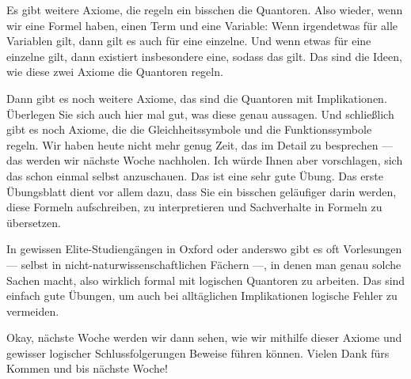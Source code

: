 \begin{spoken-clean}[01:24:37 - 01:26:27]
Es gibt weitere Axiome, die regeln ein bisschen die Quantoren. Also wieder, wenn wir eine Formel haben, einen Term und eine Variable: Wenn irgendetwas für alle Variablen gilt, dann gilt es auch für eine einzelne. Und wenn etwas für eine einzelne gilt, dann existiert insbesondere eine, sodass das gilt. Das sind die Ideen, wie diese zwei Axiome die Quantoren regeln.

Dann gibt es noch weitere Axiome, das sind die Quantoren mit Implikationen. Überlegen Sie sich auch hier mal gut, was diese genau aussagen. Und schließlich gibt es noch Axiome, die die Gleichheitssymbole und die Funktionssymbole regeln. Wir haben heute nicht mehr genug Zeit, das im Detail zu besprechen --- das werden wir nächste Woche nachholen. Ich würde Ihnen aber vorschlagen, sich das schon einmal selbst anzuschauen. Das ist eine sehr gute Übung. Das erste Übungsblatt dient vor allem dazu, dass Sie ein bisschen geläufiger darin werden, diese Formeln aufschreiben, zu interpretieren und Sachverhalte in Formeln zu übersetzen.

In gewissen Elite-Studiengängen in Oxford oder anderswo gibt es oft Vorlesungen --- selbst in nicht-naturwissenschaftlichen Fächern ---, in denen man genau solche Sachen macht, also wirklich formal mit logischen Quantoren zu arbeiten. Das sind einfach gute Übungen, um auch bei alltäglichen Implikationen logische Fehler zu vermeiden.

Okay, nächste Woche werden wir dann sehen, wie wir mithilfe dieser Axiome und gewisser logischer Schlussfolgerungen Beweise führen können. Vielen Dank fürs Kommen und bis nächste Woche!
\end{spoken-clean}


